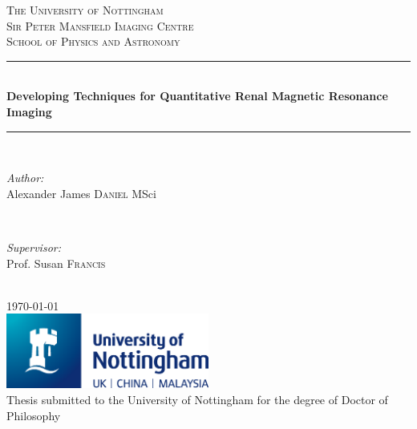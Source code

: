 \documentclass[11pt,a4paper,oneside]{report}
\author{Alexander James Daniel}
\newcommand\blankpage{
    \null
    \thispagestyle{empty}
    \addtocounter{page}{-1}
    \newpage}
\begin{document}
{
\begin{titlepage}

\newcommand{\HRule}{\rule{\linewidth}{0.5mm}}
\center
 
\textsc{\LARGE The University of Nottingham}\\[0.5cm]
\textsc{\Large Sir Peter Mansfield Imaging Centre}\\[0.5cm]
\textsc{\large School of Physics and Astronomy}\\[0.5cm]

\HRule \\[0.4cm]
{ \Large \bfseries Developing Techniques for Quantitative Renal Magnetic Resonance Imaging}\\[0.2cm]
\HRule \\[1.5cm]

\begin{minipage}{0.4\textwidth}
\begin{flushleft} \large
\emph{Author:}\\
Alexander James \textsc{Daniel} MSci
\end{flushleft}
\end{minipage}
~
\begin{minipage}{0.4\textwidth}
\begin{flushright} \large
\emph{Supervisor:} \\
Prof. Susan \textsc{Francis}
\end{flushright}
\end{minipage}\\[4cm]
{\large \today}\\[2cm]

\includegraphics[width=0.5\textwidth]{UoN_Primary_Logo_CMYK.eps}\\[1cm]
Thesis submitted to the University of Nottingham for the degree of Doctor of Philosophy
\vfill
\afterpage{\blankpage}
\end{titlepage}
}
\pagestyle{plain}


\setcounter{tocdepth}{2}
\tableofcontents
\newpage


\end{document}
